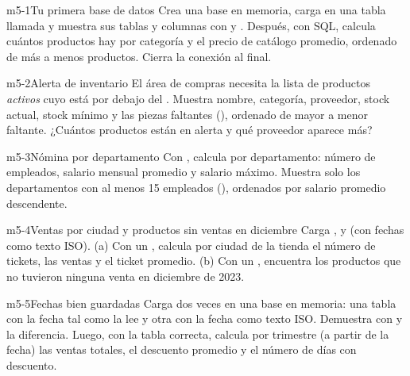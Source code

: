\begin{ejercicio}{m5-1}{Tu primera base de datos}
Crea una base en memoria, carga  en una tabla
llamada  y muestra sus tablas y columnas con
 y . Después, con SQL,
calcula cuántos productos hay por categoría y el precio de catálogo
promedio, ordenado de más a menos productos. Cierra la conexión al final.
\end{ejercicio}

\begin{ejercicio}{m5-2}{Alerta de inventario}
El área de compras necesita la lista de productos \emph{activos} cuyo
 está por debajo del . Muestra
nombre, categoría, proveedor, stock actual, stock mínimo y las piezas
faltantes (), ordenado de mayor a
menor faltante. ¿Cuántos productos están en alerta y qué proveedor
aparece más?
\end{ejercicio}

\begin{ejercicio}{m5-3}{Nómina por departamento}
Con , calcula por departamento: número de
empleados, salario mensual promedio y salario máximo. Muestra solo los
departamentos con al menos 15 empleados (), ordenados por
salario promedio descendente.
\end{ejercicio}

\begin{ejercicio}{m5-4}{Ventas por ciudad y productos sin ventas en diciembre}
Carga ,  y
 (con fechas como texto ISO). (a) Con un
, calcula por ciudad de la tienda el número de tickets,
las ventas y el ticket promedio. (b) Con un , encuentra
los productos que no tuvieron ninguna venta en diciembre de 2023.
\end{ejercicio}

\begin{ejercicio}{m5-5}{Fechas bien guardadas}
Carga  dos veces en una base en memoria: una
tabla  con la fecha tal como la lee
 y otra  con la fecha como texto ISO.
Demuestra con  y  la diferencia. Luego,
con la tabla correcta, calcula por trimestre (a partir de la fecha) las
ventas totales, el descuento promedio y el número de días con descuento.
\end{ejercicio}

